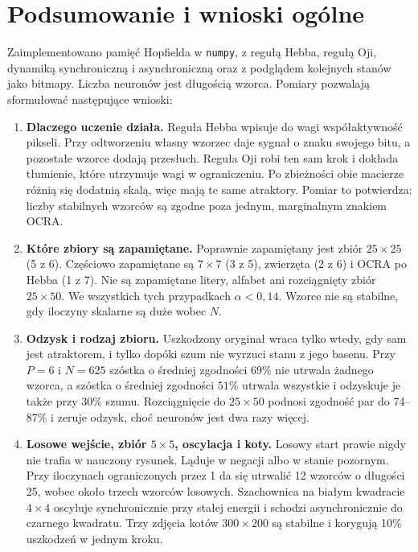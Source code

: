 \documentclass[11pt,a4paper]{article}
\begin{document}
\section{Podsumowanie i wnioski ogólne}
\label{sec:summary}

Zaimplementowano pamięć Hopfielda w \texttt{numpy}, z regułą Hebba, regułą Oji, dynamiką synchroniczną i asynchroniczną oraz z podglądem kolejnych stanów jako bitmapy. Liczba neuronów jest długością wzorca. Pomiary pozwalają sformułować następujące wnioski:

\begin{enumerate}
    \item \textbf{Dlaczego uczenie działa.}
    Reguła Hebba wpisuje do wagi współaktywność pikseli. Przy odtworzeniu własny wzorzec daje sygnał o znaku swojego bitu, a pozostałe wzorce dodają przesłuch. Reguła Oji robi ten sam krok i dokłada tłumienie, które utrzymuje wagi w ograniczeniu. Po zbieżności obie macierze różnią się dodatnią skalą, więc mają te same atraktory. Pomiar to potwierdza: liczby stabilnych wzorców są zgodne poza jednym, marginalnym znakiem OCRA.

    \item \textbf{Które zbiory są zapamiętane.}
    Poprawnie zapamiętany jest zbiór \(25\times 25\) (5 z 6). Częściowo zapamiętane są \(7\times 7\) (3 z 5), zwierzęta (2 z 6) i OCRA po Hebba (1 z 7). Nie są zapamiętane litery, alfabet ani rozciągnięty zbiór \(25\times 50\). We wszystkich tych przypadkach \(\alpha < 0{,}14\). Wzorce nie są stabilne, gdy iloczyny skalarne są duże wobec \(N\).

    \item \textbf{Odzysk i rodzaj zbioru.}
    Uszkodzony oryginał wraca tylko wtedy, gdy sam jest atraktorem, i tylko dopóki szum nie wyrzuci stanu z jego basenu. Przy \(P = 6\) i \(N = 625\) szóstka o średniej zgodności \(69\%\) nie utrwala żadnego wzorca, a szóstka o średniej zgodności \(51\%\) utrwala wszystkie i odzyskuje je także przy \(30\%\) szumu. Rozciągnięcie do \(25\times 50\) podnosi zgodność par do 74--87\% i zeruje odzysk, choć neuronów jest dwa razy więcej.

    \item \textbf{Losowe wejście, zbiór \(5\times 5\), oscylacja i koty.}
    Losowy start prawie nigdy nie trafia w nauczony rysunek. Ląduje w negacji albo w stanie pozornym. Przy iloczynach ograniczonych przez 1 da się utrwalić 12 wzorców o długości 25, wobec około trzech wzorców losowych. Szachownica na białym kwadracie \(4\times 4\) oscyluje synchronicznie przy stałej energii i schodzi asynchronicznie do czarnego kwadratu. Trzy zdjęcia kotów \(300\times 200\) są stabilne i korygują 10\% uszkodzeń w jednym kroku.
\end{enumerate}
\end{document}
